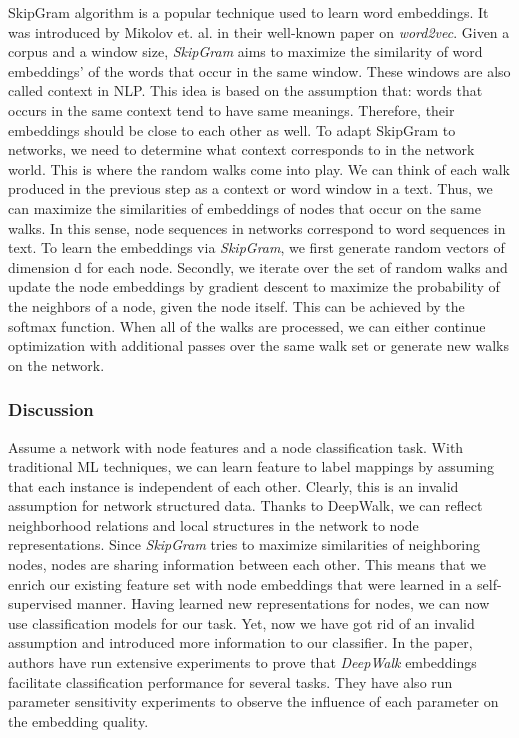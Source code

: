 \documentclass[12pt,a4paper]{article}
\begin{document}
SkipGram algorithm is a popular technique used to learn word embeddings. It was introduced by Mikolov et. al. in their well-known paper on \textit{word2vec}. Given a corpus and a window size, \textit{SkipGram} aims to maximize the similarity of word embeddings’ of the words that occur in the same window. These windows are also called context in NLP. This idea is based on the assumption that: words that occurs in the same context tend to have same meanings. Therefore, their embeddings should be close to each other as well. To adapt SkipGram to networks, we need to determine what context corresponds to in the network world. This is where the random walks come into play. We can think of each walk produced in the previous step as a context or word window in a text. Thus, we can maximize the similarities of embeddings of nodes that occur on the same walks. In this sense, node sequences in networks correspond to word sequences in text. To learn the embeddings via \textit{SkipGram}, we first generate random vectors of dimension d for each node. Secondly, we iterate over the set of random walks and update the node embeddings by gradient descent to maximize the probability of the neighbors of a node, given the node itself. This can be achieved by the softmax function. When all of the walks are processed, we can either continue optimization with additional passes over the same walk set or generate new walks on the network.

\subsubsection*{Discussion}
Assume a network with node features and a node classification task. With traditional ML techniques, we can learn feature to label mappings by assuming that each instance is independent of each other. Clearly, this is an invalid assumption for network structured data. Thanks to DeepWalk, we can reflect neighborhood relations and local structures in the network to node representations. Since \textit{SkipGram} tries to maximize similarities of neighboring nodes, nodes are sharing information between each other. This means that we enrich our existing feature set with node embeddings that were learned in a self-supervised manner. Having learned new representations for nodes, we can now use classification models for our task. Yet, now we have got rid of an invalid assumption and introduced more information to our classifier. In the paper, authors have run extensive experiments to prove that \textit{DeepWalk} embeddings facilitate classification performance for several tasks. They have also run parameter sensitivity experiments to observe the influence of each parameter on the embedding quality.
\end{document}
